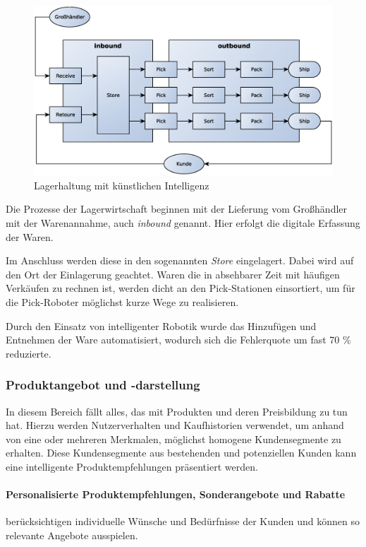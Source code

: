 \begin{figure}[!ht]
	\centering
	\includegraphics[width=\linewidth]{images/logistics-ecommerce.eps}
	\caption{Lagerhaltung mit künstlichen Intelligenz}
	\label{img:logistics_schema_in_e__commerce}
\end{figure}

Die Prozesse der Lagerwirtschaft beginnen mit der Lieferung vom Großhändler mit der Warenannahme, auch \textit{inbound} genannt. Hier erfolgt die digitale Erfassung der Waren.\vspace{0.2cm}

Im Anschluss werden diese in den sogenannten \textit{Store} eingelagert. Dabei wird auf den Ort der Einlagerung geachtet. Waren die in absehbarer Zeit mit häufigen Verkäufen zu rechnen ist, werden dicht an den Pick-Stationen einsortiert, um für die Pick-Roboter möglichst kurze Wege zu realisieren.\vspace{0.2cm}



Durch den Einsatz von intelligenter Robotik wurde das Hinzufügen und Entnehmen der Ware automatisiert, wodurch sich die Fehlerquote um fast 70 \% reduzierte.

\subsubsection{Produktangebot und -darstellung}
In diesem Bereich fällt alles, das mit Produkten und deren Preisbildung zu tun hat. Hierzu werden Nutzerverhalten und Kaufhistorien verwendet, um anhand von eine oder mehreren Merkmalen, möglichst homogene Kundensegmente zu erhalten. Diese Kundensegmente aus bestehenden und potenziellen Kunden kann eine intelligente Produktempfehlungen präsentiert werden.

\paragraph{Personalisierte Produktempfehlungen, Sonderangebote und Rabatte} berücksichtigen individuelle Wünsche und Bedürfnisse der Kunden und können so relevante Angebote ausspielen.\vspace{0.2cm}

